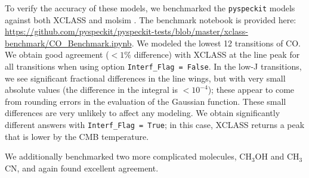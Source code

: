 \documentclass[twocolumn]{aastex63}
\newcommand{\pyspeckit}{\texttt{pyspeckit}\xspace}
\begin{document}
To verify the accuracy of these models, we benchmarked the \pyspeckit models against both XCLASS \citep{Moller2017} and molsim \citep{Lee2021}.
The benchmark notebook is provided here: \url{https://github.com/pyspeckit/pyspeckit-tests/blob/master/xclass-benchmark/CO_Benchmark.ipynb}.
We modeled the lowest 12 transitions of CO.
We obtain good agreement ($<1\%$ difference) with XCLASS at the line peak for all transitions when using option \texttt{Interf\_Flag = False}.
In the low-J transitions, we see significant fractional differences in the line wings, but with very small absolute values (the difference in the integral is $<10^{-4}$); these appear to come from rounding errors in the evaluation of the Gaussian function.
These small differences are very unlikely to affect any modeling.
We obtain significantly different answers with \texttt{Interf\_Flag = True}; in this case, XCLASS returns a peak that is lower by the CMB temperature.

We additionally benchmarked two more complicated molecules, CH$_3$OH and CH$_3$CN, and again found excellent agreement.

\end{document}
